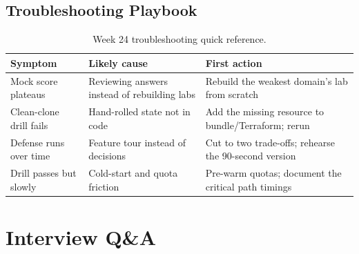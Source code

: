 \subsection{Troubleshooting Playbook}
\begin{table}[H]
\centering
\small
\begin{tabular}{@{}p{3.6cm}p{4.2cm}p{4.8cm}@{}}
\toprule
\textbf{Symptom} & \textbf{Likely cause} & \textbf{First action} \\
\midrule
Mock score plateaus & Reviewing answers instead of rebuilding labs & Rebuild the weakest domain's lab from scratch \\
Clean-clone drill fails & Hand-rolled state not in code & Add the missing resource to bundle/Terraform; rerun \\
Defense runs over time & Feature tour instead of decisions & Cut to two trade-offs; rehearse the 90-second version \\
Drill passes but slowly & Cold-start and quota friction & Pre-warm quotas; document the critical path timings \\
\bottomrule
\end{tabular}
\caption{Week 24 troubleshooting quick reference.}
\label{tab:ch24-trouble}
\end{table}

\section{Interview Q\&A}
